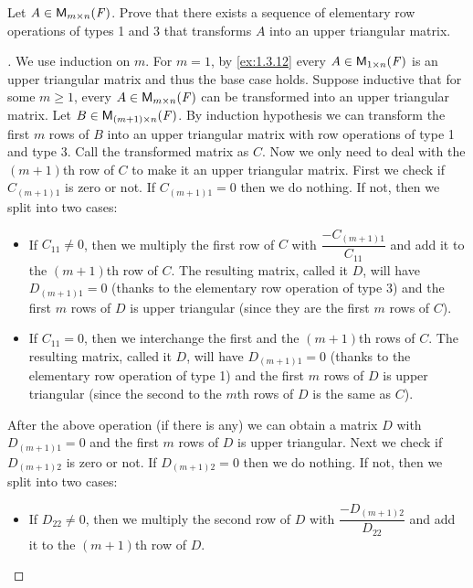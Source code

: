 \begin{ex}\label{ex:3.1.12}
  Let \(A \in \ms\).
  Prove that there exists a sequence of elementary row operations of types 1 and 3 that transforms \(A\) into an upper triangular matrix.
\end{ex}

\begin{proof}[]
  We use induction on \(m\).
  For \(m = 1\), by \cref{ex:1.3.12} every \(A \in \ms[1][n][\F]\) is an upper triangular matrix and thus the base case holds.
  Suppose inductive that for some \(m \geq 1\), every \(A \in \ms\) can be transformed into an upper triangular matrix.
  Let \(B \in \ms[(m + 1)][n][\F]\).
  By induction hypothesis we can transform the first \(m\) rows of \(B\) into an upper triangular matrix with row operations of type 1 and type 3.
  Call the transformed matrix as \(C\).
  Now we only need to deal with the \((m + 1)\)th row of \(C\) to make it an upper triangular matrix.
  First we check if \(C_{(m + 1) 1}\) is zero or not.
  If \(C_{(m + 1) 1} = 0\) then we do nothing.
  If not, then we split into two cases:
  \begin{itemize}
    \item If \(C_{1 1} \neq 0\), then we multiply the first row of \(C\) with \(\dfrac{-C_{(m + 1) 1}}{C_{1 1}}\) and add it to the \((m + 1)\)th row of \(C\).
          The resulting matrix, called it \(D\), will have \(D_{(m + 1) 1} = 0\) (thanks to the elementary row operation of type 3) and the first \(m\) rows of \(D\) is upper triangular (since they are the first \(m\) rows of \(C\)).
    \item If \(C_{1 1} = 0\), then we interchange the first and the \((m + 1)\)th rows of \(C\).
          The resulting matrix, called it \(D\), will have \(D_{(m + 1) 1} = 0\) (thanks to the elementary row operation of type 1) and the first \(m\) rows of \(D\) is upper triangular (since the second to the \(m\)th rows of \(D\) is the same as \(C\)).
  \end{itemize}
  After the above operation (if there is any) we can obtain a matrix \(D\) with \(D_{(m + 1) 1} = 0\) and the first \(m\) rows of \(D\) is upper triangular.
  Next we check if \(D_{(m + 1) 2}\) is zero or not.
  If \(D_{(m + 1) 2} = 0\) then we do nothing.
  If not, then we split into two cases:
  \begin{itemize}
    \item If \(D_{2 2} \neq 0\), then we multiply the second row of \(D\) with \(\dfrac{-D_{(m + 1) 2}}{D_{2 2}}\) and add it to the \((m + 1)\)th row of \(D\).

\end{itemize}
\end{proof}
